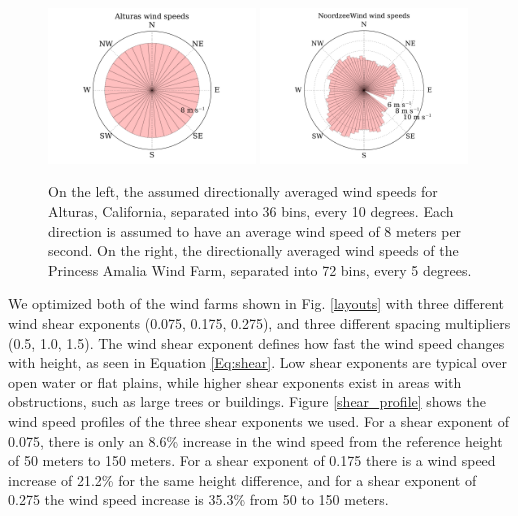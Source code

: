 \documentclass[WESD, manuscript]{copernicus}
\providecommand{\DIFaddbegin}{} %
\providecommand{\DIFaddbeginFL}{} %
\providecommand{\DIFaddendFL}{} %
\providecommand{\DIFdelbeginFL}{} %
\providecommand{\DIFdelendFL}{} %
\begin{document}
%
\begin{figure}[htbp]
  \centering
  \includegraphics[width=0.49\textwidth]{Figures/alturas_speeds.pdf}
  \DIFdelbeginFL %
\DIFdelendFL \DIFaddbeginFL \includegraphics[width=0.49\textwidth]{Figures/NZW_speeds.pdf}
  \DIFaddendFL \caption{\label{wind_speeds} On the left, the assumed directionally averaged wind speeds for Alturas, California, separated into 36 bins, every 10 degrees. Each direction is assumed to have an average wind speed of 8 meters per second. On the right, the directionally averaged wind speeds of the Princess Amalia Wind Farm, separated into 72 bins, every 5 degrees.}
\end{figure}


We optimized both of the wind farms shown in Fig. \ref{layouts} with three different wind shear exponents (0.075, 0.175, 0.275), and three different spacing multipliers (0.5, 1.0, 1.5). The wind shear exponent defines how fast the wind speed changes with height, as seen in Equation \ref{Eq:shear}. Low shear exponents are typical over open water or flat plains, while higher shear exponents exist in areas with obstructions, such as large trees or buildings. Figure \ref{shear_profile} shows the wind speed profiles of the three shear exponents we used. For a shear exponent of 0.075, there is only an 8.6\% increase in the wind speed from the reference height of 50 meters to 150 meters. For a shear exponent of 0.175 there is a wind speed increase of 21.2\% for the same height difference, and for a shear exponent of 0.275 the wind speed increase is 35.3\% from 50 to 150 meters. 
\DIFaddbegin 
\end{document}
